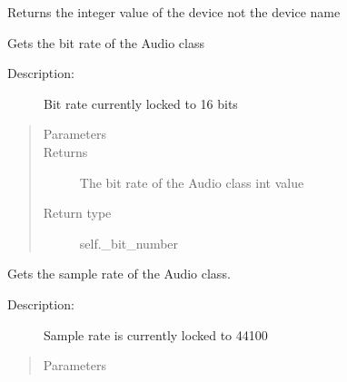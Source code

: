 \documentclass[letterpaper,10pt,english,openany,oneside]{sphinxmanual}
\begin{document}
\begin{fulllineitems}
\begin{fulllineitems}
\sphinxAtStartPar
Returns the integer value of the device not the device name

\end{fulllineitems}


\begin{fulllineitems}
\label{\detokenize{dpav:dpav.audio.Audio.get_bit_number}}
\sphinxAtStartPar
Gets the bit rate of the Audio class
\begin{description}
\item[{Description:}] \leavevmode
\sphinxAtStartPar
Bit rate currently locked to 16 bits

\end{description}
\begin{quote}\begin{description}
\item[{Parameters}] \leavevmode
\sphinxAtStartPar
{} \textendash{} 

\item[{Returns}] \leavevmode
\sphinxAtStartPar
The bit rate of the Audio class \sphinxhyphen{} int value

\item[{Return type}] \leavevmode
\sphinxAtStartPar
self.\_bit\_number

\end{description}\end{quote}

\end{fulllineitems}


\begin{fulllineitems}
\label{\detokenize{dpav:dpav.audio.Audio.get_sample_rate}}
\sphinxAtStartPar
Gets the sample rate of the Audio class.
\begin{description}
\item[{Description:}] \leavevmode
\sphinxAtStartPar
Sample rate is currently locked to 44100

\end{description}
\begin{quote}\begin{description}
\item[{Parameters}] \leavevmode
\sphinxAtStartPar
{} \textendash{} 


\end{description}
\end{quote}
\end{fulllineitems}
\end{fulllineitems}
\end{document}
